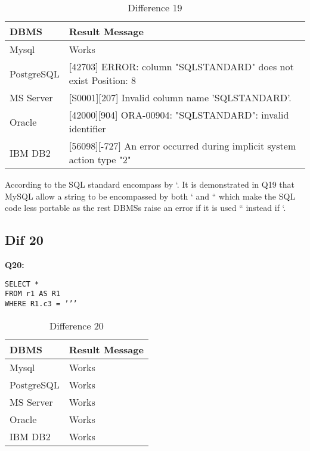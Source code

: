  
\begin{table}[h]
\centering
\caption{Difference 19}
\label{my-label}
\begin{tabular}{|p{2cm}|p{11.5cm}| }
\hline
\textbf{DBMS} & \textbf{Result Message}                                                        \\ \hline
Mysql         & Works                                                                          \\ \hline
PostgreSQL    & {[}42703{]} ERROR: column "SQLSTANDARD" does not exist Position: 8             \\ \hline
MS Server     & {[}S0001{]}{[}207{]} Invalid column name 'SQLSTANDARD'.                        \\ \hline
Oracle        & {[}42000{]}{[}904{]} ORA-00904: "SQLSTANDARD": invalid identifier              \\ \hline
IBM DB2       & {[}56098{]}{[}-727{]} An error occurred during implicit system action type "2" \\ \hline
\end{tabular}
\end{table}

\hfill\newpage
According to the SQL standard encompass by ‘. It is demonstrated in Q19 that MySQL allow a string to be encompassed by both ‘ and “ which make the SQL code less portable as the rest DBMSs raise an error if it is used “ instead if ‘. 


\subsection{Dif 20}

\textbf{Q20:}
\begin{mdframed}[backgroundcolor=lightgray!20]
\begin{lstlisting}[style=SQL]
SELECT *
FROM r1 AS R1
WHERE R1.c3 = ’’’
\end{lstlisting}
\end{mdframed}
 
\begin{table}[h]
\centering
\caption{Difference 20}
\label{my-label}
\begin{tabular}{|p{2cm}|p{11.5cm}| }
\hline
\textbf{DBMS} & \textbf{Result Message} \\ \hline
Mysql         & Works                   \\ \hline
PostgreSQL    & Works                   \\ \hline
MS Server     & Works                   \\ \hline
Oracle        & Works                   \\ \hline
IBM DB2       & Works                   \\ \hline
\end{tabular}
\end{table}


